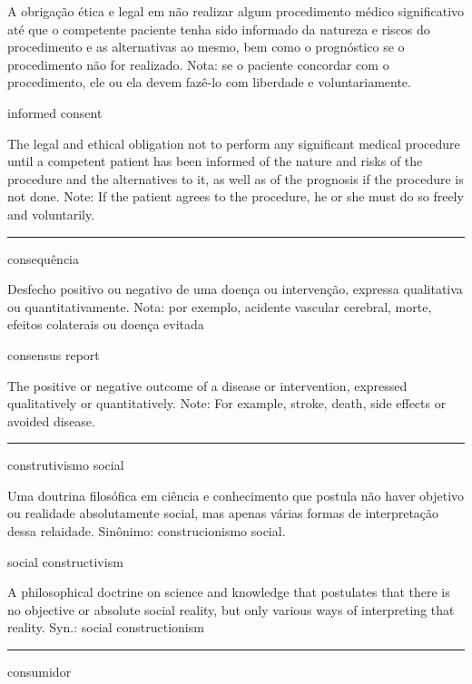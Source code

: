 \documentclass[
]{book}
\begin{document}
A obrigação ética e legal em não realizar algum procedimento médico significativo até que o competente paciente tenha sido informado da natureza e riscos do procedimento e as alternativas ao mesmo, bem como o prognóstico se o procedimento não for realizado. Nota: se o paciente concordar com o procedimento, ele ou ela devem fazê-lo com liberdade e voluntariamente.

informed consent

The legal and ethical obligation not to perform any significant medical procedure until a competent patient has been informed of the nature and risks of the procedure and the alternatives to it, as well as of the prognosis if the procedure is not done. Note: If the patient agrees to the procedure, he or she must do so freely and voluntarily.

\begin{center}\rule{0.5\linewidth}{0.5pt}\end{center}

consequência

Desfecho positivo ou negativo de uma doença ou intervenção, expressa qualitativa ou quantitativamente. Nota: por exemplo, acidente vascular cerebral, morte, efeitos colaterais ou doença evitada

consensus report

The positive or negative outcome of a disease or intervention, expressed qualitatively or quantitatively. Note: For example, stroke, death, side effects or avoided disease.

\begin{center}\rule{0.5\linewidth}{0.5pt}\end{center}

construtivismo social

Uma doutrina filosófica em ciência e conhecimento que postula não haver objetivo ou realidade absolutamente social, mas apenas várias formas de interpretação dessa relaidade. Sinônimo: construcionismo social.

social constructivism

A philosophical doctrine on science and knowledge that postulates that there is no objective or absolute social reality, but only various ways of interpreting that reality. Syn.: social constructionism

\begin{center}\rule{0.5\linewidth}{0.5pt}\end{center}

consumidor
\end{document}
